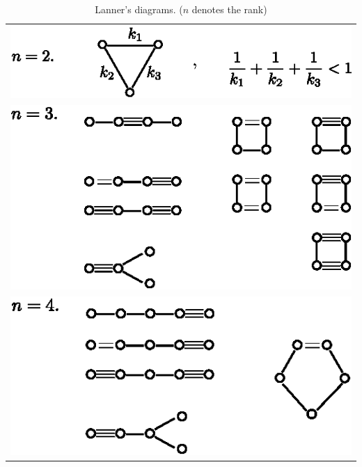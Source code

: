 \begin{enumerate}
{
\renewcommand{\arraystretch}{1.2}
\tabcolsep=10pt
\begin{longtable}{@{}l@{}}
\caption{Lanner's diagrams. ($n$ denotes the rank)}\\
 {\includegraphics{345b.eps}}\\
 {\includegraphics{345c.eps}}\\
{\includegraphics{345d.eps}}
\end{longtable}}\relax


\end{enumerate}
